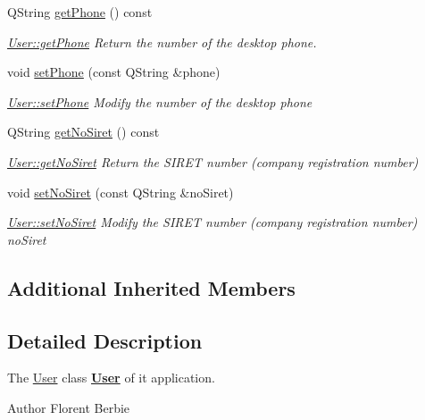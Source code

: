 \begin{DoxyCompactItemize}
Q\+String \hyperlink{classUser_a5408061a1ba87e3d56a51490464d1149}{get\+Phone} () const 
\begin{DoxyCompactList}\small\item\em \hyperlink{classUser_a5408061a1ba87e3d56a51490464d1149}{User\+::get\+Phone} Return the number of the desktop phone. \end{DoxyCompactList}\item 
void \hyperlink{classUser_a271e4179b9da5b409f98656b04431689}{set\+Phone} (const Q\+String \&phone)
\begin{DoxyCompactList}\small\item\em \hyperlink{classUser_a271e4179b9da5b409f98656b04431689}{User\+::set\+Phone} Modify the number of the desktop {\itshape phone} \end{DoxyCompactList}\item 
Q\+String \hyperlink{classUser_aa7585bc78c11961280fe2bef25ef2347}{get\+No\+Siret} () const 
\begin{DoxyCompactList}\small\item\em \hyperlink{classUser_aa7585bc78c11961280fe2bef25ef2347}{User\+::get\+No\+Siret} Return the S\+I\+R\+E\+T number (company registration number) \end{DoxyCompactList}\item 
void \hyperlink{classUser_a379258b1d6f8427f44c4e9fc7600919d}{set\+No\+Siret} (const Q\+String \&no\+Siret)
\begin{DoxyCompactList}\small\item\em \hyperlink{classUser_a379258b1d6f8427f44c4e9fc7600919d}{User\+::set\+No\+Siret} Modify the S\+I\+R\+E\+T number (company registration number) {\itshape no\+Siret} \end{DoxyCompactList}\end{DoxyCompactItemize}
\subsection*{Additional Inherited Members}


\subsection{Detailed Description}
The \hyperlink{classUser}{User} class {\bfseries \hyperlink{classUser}{User}} of it application. 

\begin{DoxyAuthor}{Author}
Florent Berbie 
\end{DoxyAuthor}


